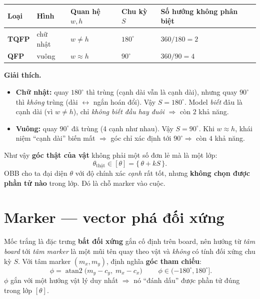 \documentclass[12pt,a4paper]{article}
\newcommand{\atantwo}{\operatorname{atan2}}
\begin{document}
\begin{table}[h]
\centering
\begin{tabular}{@{}lllll@{}}
\toprule
Loại & Hình & Quan hệ $w,h$ & Chu kỳ $S$ & Số hướng không phân biệt \\
\midrule
\textbf{TQFP} & chữ nhật & $w \neq h$    & $180^\circ$ & $360/180 = 2$ \\
\textbf{QFP}  & vuông    & $w \approx h$ & $90^\circ$  & $360/90 = 4$ \\
\bottomrule
\end{tabular}
\end{table}

\noindent\textbf{Giải thích.}
\begin{itemize}[leftmargin=1.4em]
  \item \textbf{Chữ nhật:} quay $180^\circ$ thì trùng (cạnh dài vẫn là cạnh dài), nhưng quay
        $90^\circ$ thì \emph{không} trùng (dài $\leftrightarrow$ ngắn hoán đổi). Vậy
        $S=180^\circ$. Model \emph{biết} đâu là cạnh dài (vì $w \neq h$), chỉ \emph{không
        biết đầu hay đuôi} $\Rightarrow$ còn $2$ khả năng.
  \item \textbf{Vuông:} quay $90^\circ$ đã trùng (4 cạnh như nhau). Vậy $S=90^\circ$. Khi
        $w \approx h$, khái niệm ``cạnh dài'' biến mất $\Rightarrow$ góc chỉ xác định tới
        $90^\circ \Rightarrow$ còn $4$ khả năng.
\end{itemize}

Như vậy \textbf{góc thật của vật} không phải một số đơn lẻ mà là một lớp:
\[
\theta_{\text{thật}} \in [\theta] = \{\, \theta + kS \,\}.
\]
OBB cho ta đại diện $\theta$ với độ chính xác \emph{cạnh} rất tốt, nhưng \textbf{không chọn
được phần tử nào} trong lớp. Đó là chỗ marker vào cuộc.

\section{Marker --- vector phá đối xứng}

Mốc trắng là đặc trưng \textbf{bất đối xứng} gắn cố định trên board, nên hướng từ
\emph{tâm board} tới \emph{tâm marker} là một mũi tên quay theo vật và \emph{không} có tính
đối xứng chu kỳ $S$. Với tâm marker $(m_x, m_y)$, định nghĩa \textbf{góc tham chiếu}:
\[
\boxed{\;\phi = \atantwo\bigl(m_y - c_y,\; m_x - c_x\bigr)\;}
\qquad \phi \in (-180^\circ, 180^\circ].
\]
$\phi$ gắn với một hướng vật lý duy nhất $\Rightarrow$ nó ``đánh dấu'' được phần tử đúng
trong lớp $[\theta]$.
\end{document}

